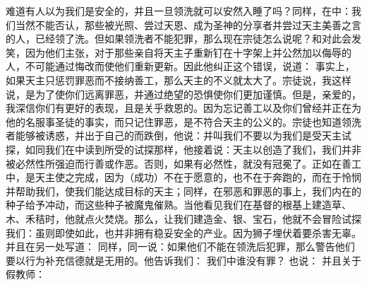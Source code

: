 难道有人以为我们是安全的，并且一旦领洗就可以安然入睡了吗？同样，在中：我们当然不能否认，那些被光照、尝过天恩、成为圣神的分享者并尝过天主美善之言的人，已经领了洗。但如果领洗者不能犯罪，那么现在宗徒怎么说呢？和对此会发笑，因为他们主张，对于那些亲自将天主子重新钉在十字架上并公然加以侮辱的人，不可能通过悔改而使他们重新更新。因此他纠正这个错误，说道： 事实上，如果天主只惩罚罪恶而不接纳善工，那么天主的不义就太大了。宗徒说，我这样说，是为了使你们远离罪恶，并通过绝望的恐惧使你们更加谨慎。但是，亲爱的，我深信你们有更好的表现，且是关乎救恩的。因为忘记善工以及你们曾经并正在为他的名服事圣徒的事实，而只记住罪恶，是不符合天主的公义的。宗徒也知道领洗者能够被诱惑，并出于自己的而跌倒，他说：并叫我们不要以为我们是受天主试探，如同我们在中读到所受的试探那样，他接着说：天主以创造了我们，我们并非被必然性所强迫而行善或作恶。否则，如果有必然性，就没有冠冕了。正如在善工中，是天主使之完成，因为（成功）不在于愿意的，也不在于奔跑的，而在于怜悯并帮助我们，使我们能达成目标的天主；同样，在邪恶和罪恶的事上，我们内在的种子给予冲动，而这些种子被魔鬼催熟。当他看见我们在基督的根基上建造草、木、禾秸时，他就点火焚烧。那么，让我们建造金、银、宝石，他就不会冒险试探我们：虽则即使如此，也并非拥有稳妥安全的产业。因为狮子埋伏着要杀害无辜。 并且在另一处写道： 同样，同一说：如果他们不能在领洗后犯罪，那么警告他们要以行为补充信德就是无用的。他告诉我们： 我们中谁没有罪？ 也说： 并且关于假教师： 